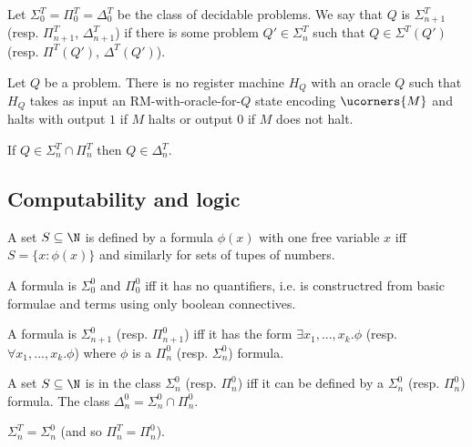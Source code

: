 \documentclass{article}
\begin{document}
\begin{definition*}
	Let $\Sigma_0^T=\Pi^T_0=\Delta^T_0$ be the class of decidable problems. We say
	that $Q$ is $\Sigma_{n+1}^T$ (resp. $\Pi_{n+1}^T$, $\Delta_{n+1}^T$)
	if there is some problem $Q'\in\Sigma_n^T$ such that $Q\in\Sigma^T(Q')$
	(resp. $\Pi^T(Q')$, $\Delta^T(Q')$).
\end{definition*}

\begin{theorem*}[Notes I.35]
	Let $Q$ be a problem. There is no register machine $H_Q$ with an oracle $Q$
	such that $H_Q$ takes as input an RM-with-oracle-for-$Q$ state encoding
	$\ucorners{M}$ and halts with output $1$ if $M$ halts or output $0$ if $M$ does not halt.
\end{theorem*}

\begin{theorem*}[Notes I.36]
	If $Q\in\Sigma_n^T\cap\Pi_n^T$ then $Q\in\Delta^T_n$.
\end{theorem*}

\subsection{Computability and logic}

\begin{definition*}
	A set $S\subseteq\N$ is defined by a formula $\phi(x)$ with one free variable
	$x$ iff $S=\{x:\phi(x)\}$ and similarly for sets of tupes of numbers.
\end{definition*}

\begin{definition*}
	A formula is $\Sigma_0^0$ and $\Pi_0^0$ iff it has no quantifiers, i.e. is
	constructred from basic formulae and terms using only boolean connectives.

	A formula is $\Sigma_{n+1}^0$ (resp. $\Pi_{n+1}^0$) iff it has the form
	$\exists x_1,...,x_k.\phi$ (resp. $\forall x_1,...,x_k.\phi$) where
	$\phi$ is a $\Pi_n^0$ (resp. $\Sigma_n^0$) formula.

	A set $S\subseteq\N$ is in the class $\Sigma_n^0$ (resp. $\Pi_n^0$)
	iff it can be defined by a $\Sigma_n^0$ (resp. $\Pi_n^0$)
	formula. The class $\Delta_n^0 = \Sigma_n^0\cap\Pi_n^0$.
\end{definition*}

\begin{theorem*}[Notes I.40]
	$\Sigma_n^T=\Sigma_n^0$ (and so $\Pi_n^T=\Pi_n^0$).
\end{theorem*}
\end{document}
